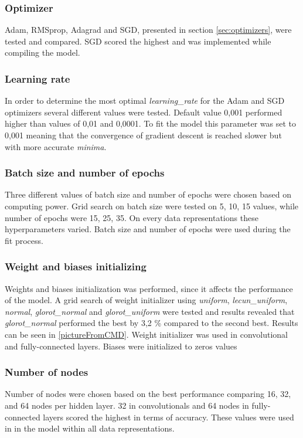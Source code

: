 \subsubsection{Optimizer}
Adam, RMSprop, Adagrad and SGD, presented in section \ref{sec:optimizers}, were tested and compared. SGD scored the highest and was implemented while compiling the model.

\subsubsection{Learning rate}
In order to determine the most optimal \textit{learning\_rate} for the Adam  and SGD optimizers several different values were tested. Default value 0,001 performed higher than values of 0,01 and 0,0001. To fit the model this parameter was set to 0,001 meaning that the convergence of gradient descent is reached slower but with more accurate \textit{minima}. 

\subsubsection{Batch size and number of epochs}
Three different values of batch size and number of epochs were chosen based on computing power. Grid search on batch size were tested on 5, 10, 15 values, while number of epochs were 15, 25, 35. On every data representations these hyperparameters varied. Batch size and number of epochs were used during the fit process.

\subsubsection{Weight and biases initializing}
Weights and biases initialization was performed, since it affects the performance of the model.
A grid search of weight initializer using \textit{uniform}, \textit{lecun\_uniform}, \textit{normal}, \textit{glorot\_normal} and \textit{glorot\_uniform} were tested and results revealed that \textit{glorot\_normal} performed the best by 3,2 \% compared to the second best. Results can be seen in \ref{pictureFromCMD}. Weight initializer was used in convolutional and fully-connected layers.
Biases were initialized to zeros values

\subsubsection{Number of nodes}
Number of nodes were chosen based on the best performance comparing 16, 32, and 64 nodes per hidden layer. 32 in convolutionals and 64 nodes in fully-connected layers scored the highest in terms of accuracy. These values were used in in the model within all data representations.

